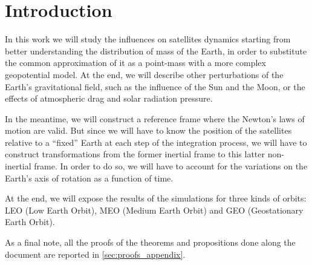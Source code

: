 \documentclass[../main.tex]{subfiles}
\begin{document}
\section{Introduction}\label{sec:intro}
In this work we will study the influences on satellites dynamics starting from better understanding the distribution of mass of the Earth, in order to substitute the common approximation of it as a point-mass with a more complex geopotential model. At the end, we will describe other perturbations of the Earth's gravitational field, such as the influence of the Sun and the Moon, or the effects of atmospheric drag and solar radiation pressure.

In the meantime, we will construct a reference frame where the Newton's laws of motion are valid. But since we will have to know the position of the satellites relative to a ``fixed'' Earth at each step of the integration process, we will have to construct transformations from the former inertial frame to this latter non-inertial frame. In order to do so, we will have to account for the variations on the Earth's axis of rotation as a function of time.

At the end, we will expose the results of the simulations for three kinds of orbits: LEO (Low Earth Orbit), MEO (Medium Earth Orbit) and GEO (Geostationary Earth Orbit).

As a final note, all the proofs of the theorems and propositions done along the document are reported in \cref{sec:proofs_appendix}.
\end{document}
